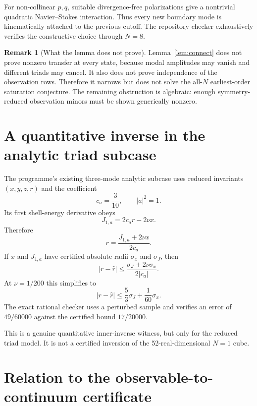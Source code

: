 \documentclass[11pt]{article}
\theoremstyle{definition}
\newtheorem{remark}[theorem]{Remark}
\begin{document}
For non-collinear $p,q$, suitable divergence-free polarizations give a nontrivial quadratic
Navier--Stokes interaction.  Thus every new boundary mode is kinematically attached to the previous
cutoff.  The repository checker exhaustively verifies the constructive choice through $N=8$.

\begin{remark}[What the lemma does not prove]
Lemma~\ref{lem:connect} does not prove nonzero transfer at every state, because modal amplitudes may
vanish and different triads may cancel.  It also does not prove independence of the observation
rows.  Therefore it narrows but does not solve the all-$N$ earliest-order saturation conjecture.
The remaining obstruction is algebraic: enough symmetry-reduced observation minors must be shown
generically nonzero.
\end{remark}

\section{A quantitative inverse in the analytic triad subcase}

The programme's existing three-mode analytic subcase uses reduced invariants $(x,y,z,r)$ and the
coefficient
\[
c_a=\frac{3}{10},\qquad |a|^2=1.
\]
Its first shell-energy derivative obeys
\begin{equation}\label{eq:triadjet}
J_{1,a}=2c_ar-2\nu x.
\end{equation}
Therefore
\begin{equation}\label{eq:rinv}
\boxed{r=\frac{J_{1,a}+2\nu x}{2c_a}.}
\end{equation}
If $x$ and $J_{1,a}$ have certified absolute radii $\sigma_x$ and $\sigma_J$, then
\begin{equation}\label{eq:rrad}
\boxed{
|r-\widehat r|
\le\frac{\sigma_J+2\nu\sigma_x}{2|c_a|}.
}
\end{equation}
At $\nu=1/200$ this simplifies to
\[
|r-\widehat r|\le\frac53\sigma_J+\frac1{60}\sigma_x.
\]
The exact rational checker uses a perturbed sample and verifies an error of $49/60000$ against the
certified bound $17/20000$.

This is a genuine quantitative inner-inverse witness, but only for the reduced triad model.  It is
not a certified inversion of the 52-real-dimensional $N=1$ cube.

\section{Relation to the observable-to-continuum certificate}
\end{document}
